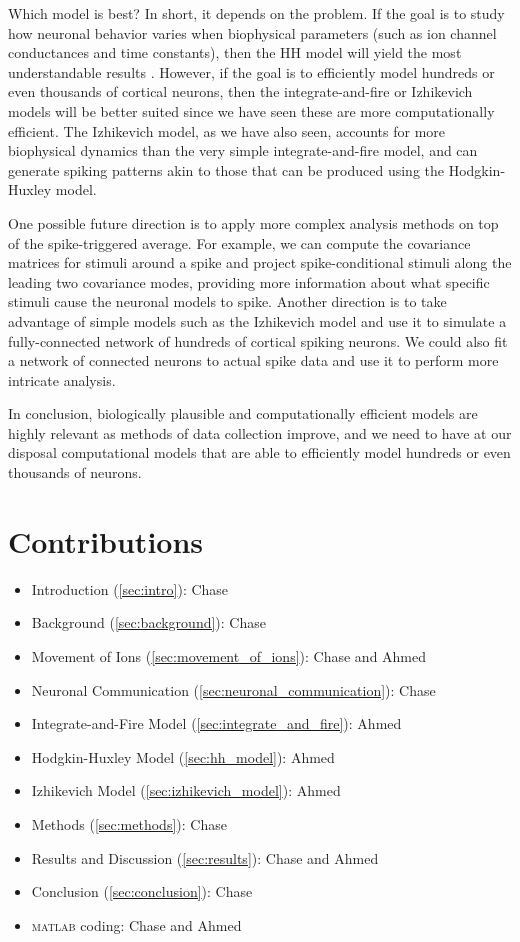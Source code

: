 \documentclass[11pt]{article}
\begin{document}
Which model is best? In short, it depends on the problem. If the goal is to study how neuronal behavior varies when biophysical parameters (such as ion channel conductances and time constants), then the HH model will yield the most understandable results \citep{izhikevich_which_model}. However, if the goal is to efficiently model hundreds or even thousands of cortical neurons, then the integrate-and-fire or Izhikevich models will be better suited since we have seen these are more computationally efficient. The Izhikevich model, as we have also seen, accounts for more biophysical dynamics than the very simple integrate-and-fire model, and can generate spiking patterns akin to those that can be produced using the Hodgkin-Huxley model.

One possible future direction is to apply more complex analysis methods on top of the spike-triggered average. For example, we can compute the covariance matrices for stimuli around a spike and project spike-conditional stimuli along the leading two covariance modes, providing more information about what specific stimuli cause the neuronal models to spike. Another direction is to take advantage of simple models such as the Izhikevich model and use it to simulate a fully-connected network of hundreds of cortical spiking neurons. We could also fit a network of connected neurons to actual spike data and use it to perform more intricate analysis.

In conclusion, biologically plausible and computationally efficient models are highly relevant as methods of data collection improve, and we need to have at our disposal computational models that are able to efficiently model hundreds or even thousands of neurons.

\newpage
\section{Contributions}
\begin{itemize}
    \item Introduction (\ref{sec:intro}): Chase
    \item Background (\ref{sec:background}): Chase
    \item Movement of Ions (\ref{sec:movement_of_ions}): Chase and Ahmed
    \item Neuronal Communication (\ref{sec:neuronal_communication}): Chase
    \item Integrate-and-Fire Model (\ref{sec:integrate_and_fire}): Ahmed
    \item Hodgkin-Huxley Model (\ref{sec:hh_model}): Ahmed
    \item Izhikevich Model (\ref{sec:izhikevich_model}): Ahmed
    \item Methods (\ref{sec:methods}): Chase
    \item Results and Discussion (\ref{sec:results}): Chase and Ahmed
    \item Conclusion (\ref{sec:conclusion}): Chase
    \item \textsc{matlab} coding: Chase and Ahmed
\end{itemize}
\end{document}
